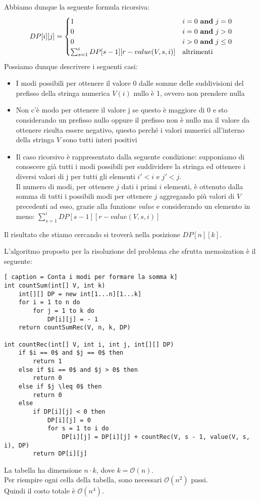 \documentclass[../cheatSheetAlgoritmi.tex]{subfiles}
\begin{document}
Abbiamo dunque la seguente formula ricorsiva: 
\begin{equation*}
  	DP[i][j] =\begin{cases}
    	1 & \text{$i = 0$ \textbf{and} $j = 0$}\\
    	0 & \text{$i = 0$ \textbf{and} $j > 0$}\\
    	0 & \text{$i > 0$ \textbf{and} $j \leq 0$}\\
    	\sum_{s = 1}^{i} DP[s - 1][r - value(V, s, i)] & \text{altrimenti}
  	\end{cases}
\end{equation*}
Possiamo dunque descrivere i seguenti casi: 
\begin{itemize}
		\item I modi possibili per ottenere il valore 0 dalle somme delle suddivisioni del prefisso della stringa numerica $V(i)$ nullo è 1, ovvero non prendere nulla
		\item Non c'è modo per ottenere il valore j se questo è maggiore di 0 e sto considerando un prefisso nullo oppure il prefisso non è nullo ma il valore da ottenere risulta essere negativo, questo perché i valori numerici all'interno della stringa $V$ sono tutti interi positivi
		\item Il caso ricorsivo è rappresentato dalla seguente condizione: supponiamo di conoscere già tutti i modi possibili per suddividere la stringa ed ottenere i diversi valori di j per tutti gli elementi $i' < i$ e $j' < j$. \\ Il numero di modi, per ottenere $j$ dati i primi $i$ elementi, è ottenuto dalla somma di tutti i possibili modi per ottenere $j$ aggregando più valori di $V$ precedenti ad esso, grazie alla funzione \emph{value} e considerando un elemento in meno: $\sum_{s = 1}^{i} DP[s - 1][r - value(V, s, i)]$
\end{itemize}
Il risultato che stiamo cercando si troverà nella posizione $DP[n][k]$. 

L'algoritmo proposto per la risoluzione del problema che sfrutta memoization è il seguente:
\newpage
\begin{lstlisting}[ caption = Conta i modi per formare la somma k]
int countSum(int[] V, int k)
	int[][] DP = new int[1...n][1...k]
	for i = 1 to n do
		for j = 1 to k do
			DP[i][j] = - 1
	return countSumRec(V, n, k, DP)

int countRec(int[] V, int i, int j, int[][] DP)
	if $i == 0$ and $j == 0$ then
		return 1
	else if $i == 0$ and $j > 0$ then
		return 0
	else if $j \leq 0$ then
		return 0
	else 
		if DP[i][j] < 0 then
			DP[i][j] = 0
			for s = 1 to i do
				DP[i][j] = DP[i][j] + countRec(V, s - 1, value(V, s, i), DP)
		return DP[i][j]
\end{lstlisting}
La tabella ha dimensione $n \cdot k$, dove $k = \mathcal{O}(n)$. \\ 
Per riempire ogni cella della tabella, sono necessari $\mathcal{O}(n^2)$ passi. \\ Quindi il costo totale è $\mathcal{O}(n^4)$. 
\newpage
\end{document}
